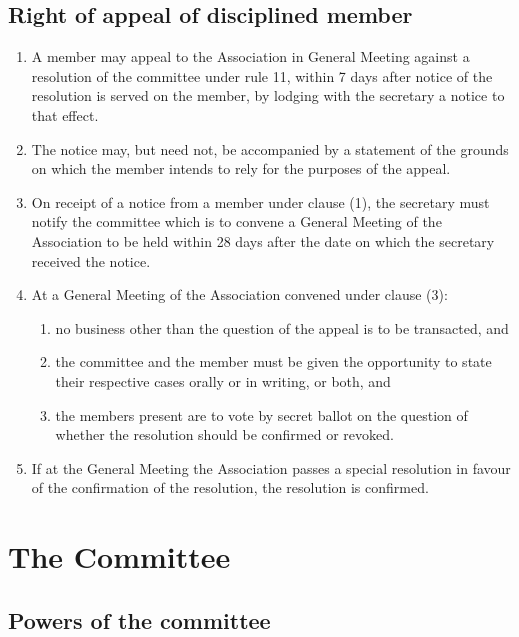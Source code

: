 \documentclass{article}
\begin{document}
\subsection{Right of appeal of disciplined member}
\begin{enumerate}
    \item A member may appeal to the Association in General Meeting against a resolution of the committee under rule 11, within 7 days after notice of the resolution is served on the member, by lodging with the secretary a notice to that effect.
    \item The notice may, but need not, be accompanied by a statement of the grounds on which the member intends to rely for the purposes of the appeal.
    \item On receipt of a notice from a member under clause (1), the secretary must notify the committee which is to convene a General Meeting of the Association to be held within 28 days after the date on which the secretary received the notice.
    \item At a General Meeting of the Association convened under clause (3): 
    \begin{enumerate}
        \item no business other than the question of the appeal is to be transacted, and
        \item the committee and the member must be given the opportunity to state their respective cases orally or in writing, or both, and
        \item the members present are to vote by secret ballot on the question of whether the resolution should be confirmed or revoked.
    \end{enumerate}
    \item If at the General Meeting the Association passes a special resolution in favour of the confirmation of the resolution, the resolution is confirmed.
\end{enumerate}
\section{The Committee}
\subsection{Powers of the committee}
\end{document}
